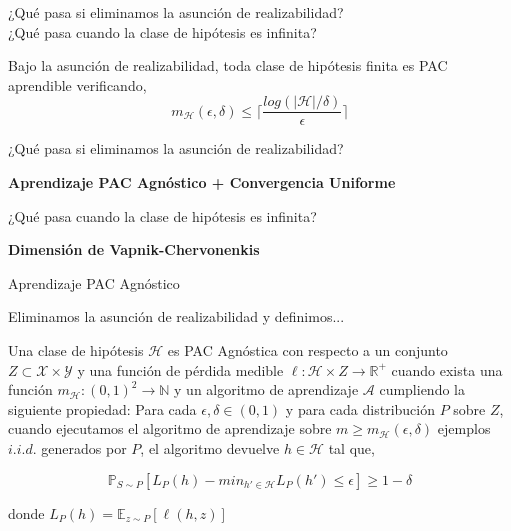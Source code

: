 \begin{frame}
\begin{overprint}
            ¿Qué pasa si eliminamos la asunción de realizabilidad? \\
            
            ¿Qué pasa cuando la clase de hipótesis es infinita?
            \begin{proposition}
            Bajo la asunción de realizabilidad, toda clase de hipótesis finita es PAC aprendible verificando, 
                \begin{equation*}
                    m_{\mathcal{H}} (\epsilon, \delta) \leq \lceil \frac{log(|\mathcal{H}|/\delta)}{\epsilon} \rceil
                \end{equation*}
            \end{proposition}
            
            ¿Qué pasa si eliminamos la asunción de realizabilidad? 
            \begin{center} \textbf{Aprendizaje PAC Agnóstico + Convergencia Uniforme} \\ \end{center}
            ¿Qué pasa cuando la clase de hipótesis es infinita? 
            \begin{center} \textbf{Dimensión de Vapnik-Chervonenkis} \end{center}
    \end{overprint}
\end{frame}




\begin{frame}{Aprendizaje PAC Agnóstico}
    \begin{overprint}
    
        Eliminamos la asunción de realizabilidad y definimos...
        
            \begin{definition}
            Una clase de hipótesis $\mathcal{H}$ es PAC Agnóstica con respecto a un conjunto $Z \subset \mathcal{X} \times \mathcal{Y}$ y una función de pérdida medible $\ell: \mathcal{H} \times Z \to \mathbb{R}^+$ cuando exista una función $m_{\mathcal{H}}:(0,1)^2 \to \mathbb{N}$ y un algoritmo de aprendizaje $\mathcal{A}$ cumpliendo la siguiente propiedad: Para cada $\epsilon ,\delta \in (0,1)$ y para cada distribución $P$ sobre $Z$, cuando ejecutamos el algoritmo de aprendizaje sobre  $m \geq m_{\mathcal{H}}(\epsilon, \delta)$ ejemplos $i.i.d.$ generados por $P$, el algoritmo devuelve $h \in \mathcal{H}$ tal que,
            
            \begin{equation}
                \mathbb{P}_{S \sim P}[L_P(h) - min_{h' \in \mathcal{H}} L_P(h') \leq \epsilon] \geq 1 - \delta
            \end{equation}
            
            donde $L_P(h) = \mathbb{E}_{z\sim P}[\ell(h,z)]$ 
            \end{definition}
            
    \end{overprint}
\end{frame}



